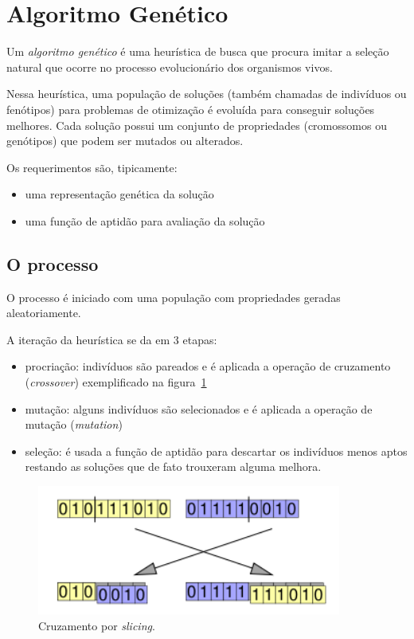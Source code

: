 \section{Algoritmo Genético}

Um \emph{algoritmo genético} é uma heurística de busca que procura
imitar a seleção natural que ocorre no processo evolucionário dos
organismos vivos.

Nessa heurística, uma população de soluções (também chamadas de
indivíduos ou fenótipos) para problemas de otimização é evoluída para
conseguir soluções melhores. Cada solução possui um conjunto de
propriedades (cromossomos ou genótipos) que podem ser mutados ou
alterados.

Os requerimentos são, tipicamente:

\begin{itemize}
\item
  uma representação genética da solução
\item
  uma função de aptidão para avaliação da solução
\end{itemize}

\subsection{O processo}

O processo é iniciado com uma população com propriedades geradas
aleatoriamente.

A iteração da heurística se da em 3 etapas:

\begin{itemize}
\item
  procriação: indivíduos são pareados e é aplicada a operação de
  cruzamento (\emph{crossover}) exemplificado na figura~\ref{fig:ga_crossover}
\item
  mutação: alguns indivíduos são selecionados e é aplicada a operação de
  mutação (\emph{mutation})
\item
  seleção: é usada a função de aptidão para descartar os indivíduos
  menos aptos restando as soluções que de fato trouxeram alguma melhora.
\end{itemize}

\begin{figure}[ht]
\centering
\includegraphics[width=10cm]{figuras/ga_crossover}
\caption{Cruzamento por \textit{slicing}.}\label{fig:ga_crossover}
\end{figure}

